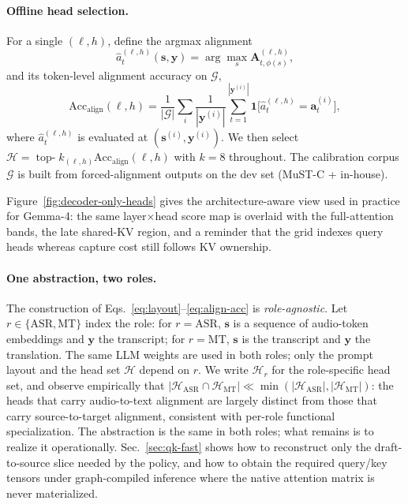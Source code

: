 \documentclass[11pt,twocolumn]{article}
\begin{document}
\paragraph{Offline head selection.}
For a single $(\ell, h)$, define the argmax alignment
\begin{equation}
  \hat{a}^{(\ell,h)}_t(\mathbf{s}, \mathbf{y})
  = \arg\max_{s} \mathbf{A}^{(\ell,h)}_{t, \phi(s)},
  \label{eq:head-argmax}
\end{equation}
and its token-level alignment accuracy on $\mathcal{G}$,
\begin{equation}
  \mathrm{Acc}_{\mathrm{align}}(\ell, h)
  = \frac{1}{|\mathcal{G}|}
  \sum_i \frac{1}{|\mathbf{y}^{(i)}|}
  \sum_{t=1}^{|\mathbf{y}^{(i)}|}
  \mathbf{1}\!\bigl[\hat{a}^{(\ell,h)}_t = \mathbf{a}^{(i)}_t\bigr],
  \label{eq:align-acc}
\end{equation}
where $\hat{a}^{(\ell,h)}_t$ is evaluated at $(\mathbf{s}^{(i)}, \mathbf{y}^{(i)})$.
We then select $\mathcal{H} = \operatorname*{top-}k_{(\ell,h)} \mathrm{Acc}_{\mathrm{align}}(\ell, h)$
with $k = 8$ throughout. The calibration corpus $\mathcal{G}$ is built from
forced-alignment outputs on the dev set (MuST-C + in-house).

Figure~\ref{fig:decoder-only-heads} gives the architecture-aware view used in
practice for Gemma-4: the same layer$\times$head score map is overlaid with
the full-attention bands, the late shared-KV region, and a reminder that the
grid indexes query heads whereas capture cost still follows KV ownership.


\paragraph{One abstraction, two roles.}
The construction of Eqs.~\eqref{eq:layout}--\eqref{eq:align-acc} is
\emph{role-agnostic}. Let $r \in \{\mathrm{ASR}, \mathrm{MT}\}$ index the
role: for $r = \mathrm{ASR}$, $\mathbf{s}$ is a sequence of audio-token
embeddings and $\mathbf{y}$ the transcript; for $r = \mathrm{MT}$,
$\mathbf{s}$ is the transcript and $\mathbf{y}$ the translation. The same
LLM weights are used in both roles; only the prompt layout and the head set
$\mathcal{H}$ depend on $r$. We write $\mathcal{H}_r$ for the
role-specific head set, and observe empirically that
$\bigl|\mathcal{H}_{\mathrm{ASR}} \cap \mathcal{H}_{\mathrm{MT}}\bigr| \ll
\min(|\mathcal{H}_{\mathrm{ASR}}|, |\mathcal{H}_{\mathrm{MT}}|)$: the heads that
carry audio-to-text alignment are largely distinct from those that carry
source-to-target alignment, consistent with per-role functional specialization. The abstraction is the same in both roles; what
remains is to realize it operationally. Sec.~\ref{sec:qk-fast} shows how to
reconstruct only the draft-to-source slice needed by the policy, and how to
obtain the required query/key tensors under graph-compiled inference where
the native attention matrix is never materialized.
\end{document}
